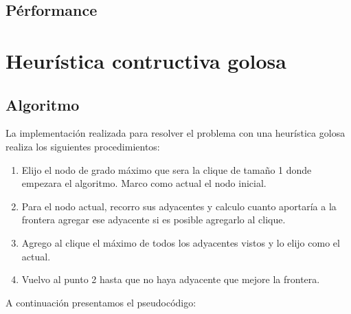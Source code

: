 \documentclass[a4paper, 10pt, twoside]{article}
\begin{document}
\subsection{Pérformance}


\newpage

\section{Heurística contructiva golosa}
\subsection{Algoritmo}
La implementación realizada para resolver el problema con una heurística golosa realiza los siguientes procedimientos:
\begin{enumerate}
\item Elijo el nodo de grado máximo que sera la clique de tamaño 1 donde empezara el algoritmo. Marco como actual el nodo inicial.
\item Para el nodo actual, recorro sus adyacentes y calculo cuanto aportaría a la frontera agregar ese adyacente si es posible agregarlo al clique.
\item Agrego al clique el máximo de todos los adyacentes vistos y lo elijo como el actual.
\item Vuelvo al punto 2 hasta que no haya adyacente que mejore la frontera.
\end{enumerate}

A continuación presentamos el pseudocódigo:
\end{document}

